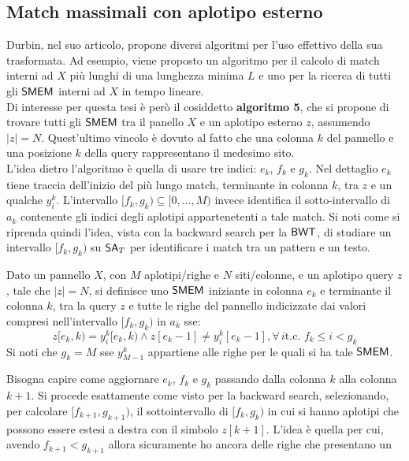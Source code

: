 \subsection{Match massimali con aplotipo esterno}
Durbin, nel suo articolo, propone diversi algoritmi per l'uso effettivo della
sua trasformata. Ad esempio, viene proposto un algoritmo per il calcolo
di match interni ad $X$ più lunghi di una lunghezza minima $L$ e uno per la
ricerca di tutti gli $\mbox{\rm {\sf SMEM}}$ interni ad $X$ in tempo lineare.\\
Di interesse per questa tesi è però il cosiddetto \textbf{algoritmo 5}, che
si propone di trovare tutti gli $\mbox{\rm {\sf SMEM}}$  tra il panello $X$ e un
aplotipo esterno $z$, assumendo $|z|=N$. Quest'ultimo vincolo è dovuto al fatto
che una colonna $k$ del
pannello e una posizione $k$ della query rappresentano il medesimo sito.\\ 
L'idea dietro l'algoritmo è quella di usare tre indici: $e_k$, $f_k$ e
$g_k$. Nel dettaglio $e_k$ tiene traccia dell'inizio del più lungo match,
terminante in colonna $k$, tra $z$ e un qualche $y_i^k$. L'intervallo
$[f_k,g_k)\subseteq[0,\ldots,M)$ invece identifica il sotto-intervallo di
$a_k$ contenente gli indici degli aplotipi appartenetenti a tale match. Si noti
come si riprenda quindi l'idea, vista con la backward search per la
$\mbox{\rm {\sf BWT}}$, di studiare un intervallo $[f_k,g_k)$ su $\mbox{\rm {\sf SA}}_T$ per identificare i
match tra un pattern e un testo. 
\begin{definizione}
  Dato un pannello $X$, con $M$ aplotipi/righe e $N$ siti/colonne, e un aplotipo
  query $z$, tale che $|z|=N$, si definisce uno $\mbox{\rm {\sf SMEM}}$ iniziante in colonna
  $e_k$ e terminante il colonna 
  $k$, tra 
  la query $z$ e tutte le righe del pannello indicizzate dai valori compresi
  nell'intervallo $[f_k,g_k)$ in $a_k$ sse:
  \begin{equation}
    \label{eq:pbwtsmem}
    z[e_k,k)=y_i^k[e_k,k)\land z[e_k-1]\neq y_i^k[e_k-1], \forall\, i\mbox{
      t.c. }f_k\leq i < g_k
  \end{equation}
  Si noti che $g_k=M$ sse $y_{M-1}^k$ appartiene alle righe per le quali si ha
  tale $\mbox{\rm {\sf SMEM}}$.
\end{definizione}
Bisogna capire come aggiornare $e_k$, $f_k$ e $g_k$ passando dalla
colonna $k$ alla colonna $k+1$. Si procede esattamente come visto per la
backward search, selezionando, per calcolare  $[f_{k+1},g_{k+1})$, il
sottointervallo di $[f_k,g_k)$ in cui si hanno aplotipi che possono essere estesi
a destra con il simbolo $z[k+1]$. L'idea è quella per cui, avendo
$f_{k+1}<g_{k+1}$ allora sicuramente ho ancora delle righe che presentano un
